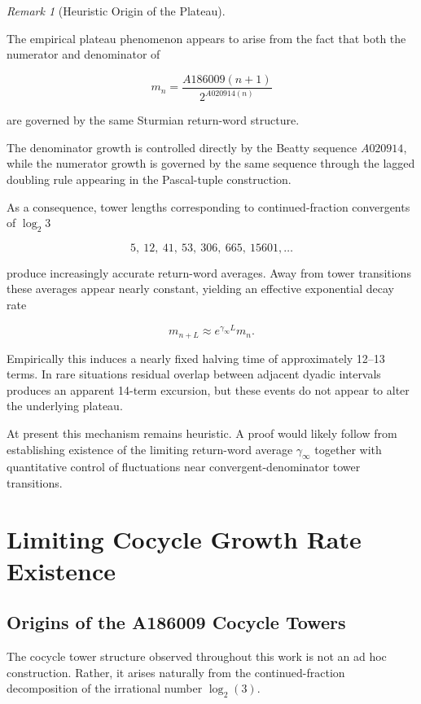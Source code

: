 \documentclass[12pt, oneside]{article}
\numberwithin{equation}{section}
\theoremstyle{definition}
\theoremstyle{plain}
\theoremstyle{remark}
\newtheorem*{remark}{Remark}
\begin{document}
\begin{remark}[Heuristic Origin of the Plateau]
\label{rem:plateau-heuristic}

The empirical plateau phenomenon appears to arise from the fact that
both the numerator and denominator of

\[
m_n
=
\frac{A186009(n+1)}
     {2^{A020914(n)}}
\]

are governed by the same Sturmian return-word structure.

The denominator growth is controlled directly by the Beatty sequence
\(A020914\), while the numerator growth is governed by the same
sequence through the lagged doubling rule appearing in the Pascal-tuple
construction.

As a consequence, tower lengths corresponding to continued-fraction
convergents of \(\log_2 3\)

\[
5,\ 12,\ 41,\ 53,\ 306,\ 665,\ 15601,\ldots
\]

produce increasingly accurate return-word averages. Away from tower
transitions these averages appear nearly constant, yielding an
effective exponential decay rate

\[
m_{n+L}
\approx
e^{\gamma_\infty L} m_n.
\]

Empirically this induces a nearly fixed halving time of approximately
12--13 terms. In rare situations residual overlap between adjacent
dyadic intervals produces an apparent 14-term excursion, but these
events do not appear to alter the underlying plateau.

At present this mechanism remains heuristic. A proof would likely
follow from establishing existence of the limiting return-word average
\(\gamma_\infty\) together with quantitative control of fluctuations
near convergent-denominator tower transitions.
\end{remark}


\section{Limiting Cocycle Growth Rate Existence}
\label{sec:limiting-cocycle-growth}

\subsection{Origins of the A186009 Cocycle Towers}

The cocycle tower structure observed throughout this work is not an ad hoc
construction. Rather, it arises naturally from the continued-fraction
decomposition of the irrational number $\log_2(3)$.
\end{document}
